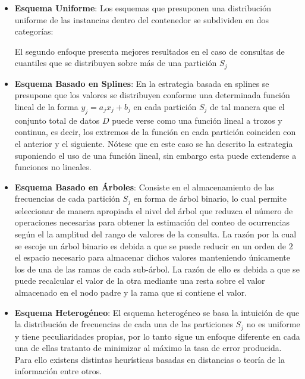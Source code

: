 \documentclass{subfiles}
\begin{document}
        \begin{itemize}

          \item \textbf{Esquema Uniforme}: Los esquemas que presuponen una distribución uniforme de las instancias dentro del contenedor se subdividen en dos categorías:  El segundo enfoque presenta mejores resultados en el caso de consultas de cuantiles que se distribuyen sobre más de una partición $S_j$

          \item \textbf{Esquema Basado en Splines}: En la estrategia basada en splines se presupone que los valores se distribuyen conforme una determinada función lineal de la forma $y_j = a_jx_j + b_j$ en cada partición $S_j$ de tal manera que el conjunto total de datos $D$ puede verse como una función lineal a trozos y continua, es decir, los extremos de la función en cada partición coinciden con el anterior y el siguiente. Nótese que en este caso se ha descrito la estrategia suponiendo el uso de una función lineal, sin embargo esta puede extenderse a funciones no lineales.

          \item \textbf{Esquema Basado en Árboles}: Consiste en el almacenamiento de las frecuencias de cada partición $S_j$ en forma de árbol binario, lo cual permite seleccionar de manera apropiada el nivel del árbol que reduzca el número de operaciones necesarias para obtener la estimación del conteo de ocurrencias según el la amplitud del rango de valores de la consulta. La razón por la cual se escoje un árbol binario es debida a que se puede reducir en un orden de $2$ el espacio necesario para almacenar dichos valores manteniendo únicamente los de una de las ramas de cada sub-árbol. La razón de ello es debida a que se puede recalcular el valor de la otra mediante una resta sobre el valor almacenado en el nodo padre y la rama que si contiene el valor.

          \item \textbf{Esquema Heterogéneo}: El esquema heterogéneo se basa la intuición de que la distribución de frecuencias de cada una de las particiones $S_j$ no es uniforme y tiene peculiaridades propias, por lo tanto sigue un enfoque diferente en cada una de ellas tratanto de minimizar al máximo la tasa de error producida. Para ello existens distintas heurísticas basadas en distancias o teoría de la información entre otros.

        \end{itemize}
\end{document}
